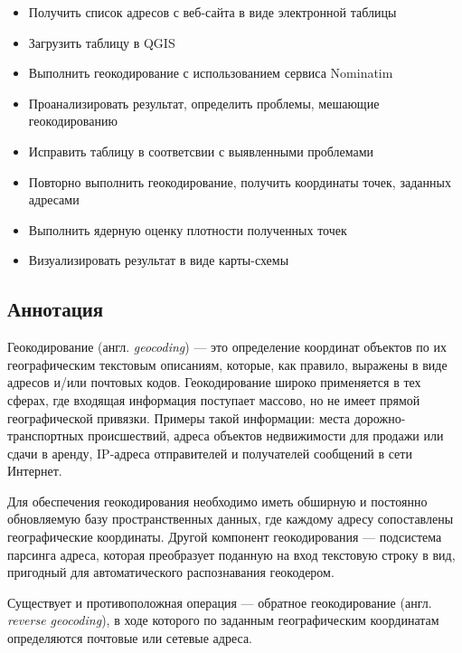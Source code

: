 \documentclass[
  12pt,
]{book}
\providecommand{\tightlist}{%
  \setlength{\itemsep}{0pt}\setlength{\parskip}{0pt}}
\begin{document}
\begin{itemize}
\tightlist
\item
  Получить список адресов с веб-сайта в виде электронной таблицы
\item
  Загрузить таблицу в QGIS
\item
  Выполнить геокодирование с использованием сервиса Nominatim
\item
  Проанализировать результат, определить проблемы, мешающие геокодированию
\item
  Исправить таблицу в соответсвии с выявленными проблемами
\item
  Повторно выполнить геокодирование, получить координаты точек, заданных адресами
\item
  Выполнить ядерную оценку плотности полученных точек
\item
  Визуализировать результат в виде карты-схемы
\end{itemize}

\hypertarget{geocoding-annotation}{%
\subsection{Аннотация}\label{geocoding-annotation}}

Геокодирование (англ. \emph{geocoding}) --- это определение координат объектов по их географическим текстовым описаниям, которые, как правило, выражены в виде адресов и/или почтовых кодов. Геокодирование широко применяется в тех сферах, где входящая информация поступает массово, но не имеет прямой географической привязки. Примеры такой информации: места дорожно-транспортных происшествий, адреса объектов недвижимости для продажи или сдачи в аренду, IP-адреса отправителей и получателей сообщений в сети Интернет.

Для обеспечения геокодирования необходимо иметь обширную и постоянно обновляемую базу пространственных данных, где каждому адресу сопоставлены географические координаты. Другой компонент геокодирования --- подсистема парсинга адреса, которая преобразует поданную на вход текстовую строку в вид, пригодный для автоматического распознавания геокодером.

Существует и противоположная операция --- обратное геокодирование (англ. \emph{reverse geocoding}), в ходе которого по заданным географическим координатам определяются почтовые или сетевые адреса.
\end{document}
